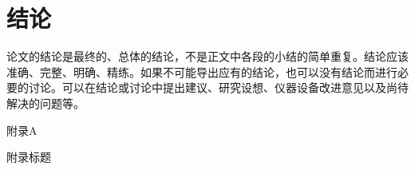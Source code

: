 \documentclass{bjtu-bachelor-thesis}
\begin{document}
\chapter{结论}
论文的结论是最终的、总体的结论，不是正文中各段的小结的简单重复。结论应该准确、完整、明确、精练。如果不可能导出应有的结论，也可以没有结论而进行必要的讨论。可以在结论或讨论中提出建议、研究设想、仪器设备改进意见以及尚待解决的问题等。
\newpage
\pagestyle{myfancy}
\nocite{*}
\printbibliography[heading=myheading]
\cleardoublepage
\thankspage
\begin{center}
    {\heiti 附录A}
\end{center}
\begin{center}
    {\heiti 附录标题}
\end{center}

\cleardoublepage
\end{document}
